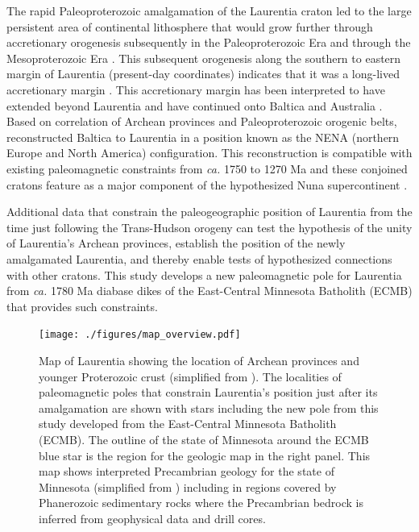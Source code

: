 \documentclass[draft]{agujournal2019}
\begin{document}
The rapid Paleoproterozoic amalgamation of the Laurentia craton led to the large persistent area of continental lithosphere that would grow further through accretionary orogenesis subsequently in the Paleoproterozoic Era and through the Mesoproterozoic Era \cite{Whitmeyer2007a}. This subsequent orogenesis along the southern to eastern margin of Laurentia (present-day coordinates) indicates that it was a long-lived accretionary margin \cite{Karlstrom2001a, Whitmeyer2007a}. This accretionary margin has been interpreted to have extended beyond Laurentia and have continued onto Baltica and Australia \cite{Karlstrom2001a}. Based on correlation of Archean provinces and Paleoproterozoic orogenic belts,  reconstructed Baltica to Laurentia in a position known as the NENA (northern Europe and North America) configuration. This reconstruction is compatible with existing paleomagnetic constraints from \textit{ca.} 1750 to 1270 Ma \cite{Evans2008a} and these conjoined cratons feature as a major component of the hypothesized Nuna supercontinent \cite{Evans2011a, Zhang2012a}. 

Additional data that constrain the paleogeographic position of Laurentia from the time just following the Trans-Hudson orogeny can test the hypothesis of the unity of Laurentia's Archean provinces, establish the position of the newly amalgamated Laurentia, and thereby enable tests of hypothesized connections with other cratons. This study develops a new paleomagnetic pole for Laurentia from \textit{ca.} 1780 Ma diabase dikes of the East-Central Minnesota Batholith (ECMB) that provides such constraints.

\begin{figure}[!ht]
\centering
\noindent\texttt{[image: ./figures/map\_overview.pdf]}
\caption{\small{Map of Laurentia showing the location of Archean provinces and younger Proterozoic crust (simplified from ). The localities of paleomagnetic poles that constrain Laurentia's position just after its amalgamation are shown with stars including the new pole from this study developed from the East-Central Minnesota Batholith (ECMB). The outline of the state of Minnesota around the ECMB blue star is the region for the geologic map in the right panel. This map shows interpreted Precambrian geology for the state of Minnesota (simplified from ) including in regions covered by Phanerozoic sedimentary rocks where the Precambrian bedrock is inferred from geophysical data and drill cores.}}
\label{fig:Laurentia_map}
\end{figure}
\end{document}
